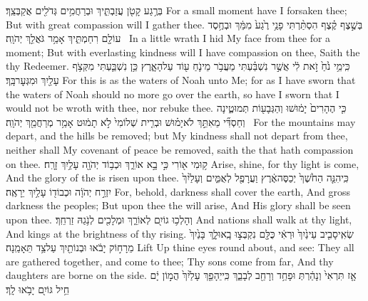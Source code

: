 {בְּרֶ֥גַע קָטֹ֖ן עֲזַבְתִּ֑יךְ וּבְרַחֲמִ֥ים גְּדֹלִ֖ים אֲקַבְּצֵֽךְ׃}
{For a small moment have I forsaken thee; But with great compassion will I gather thee.}
{בְּשֶׁ֣צֶף קֶ֗צֶף הִסְתַּ֨רְתִּי פָנַ֥י רֶ֙גַע֙ מִמֵּ֔ךְ וּבְחֶ֥סֶד עוֹלָ֖ם רִחַמְתִּ֑יךְ אָמַ֥ר גֹּאֲלֵ֖ךְ יְהֹוָֽה׃ \setuma }
{In a little wrath I hid My face from thee for a moment; But with everlasting kindness will I have compassion on thee, Saith the \lord\space thy Redeemer.}
{כִּֽי\maqqaf מֵ֥י נֹ֙חַ֙ זֹ֣את לִ֔י אֲשֶׁ֣ר נִשְׁבַּ֗עְתִּי מֵעֲבֹ֥ר מֵי\maqqaf נֹ֛חַ ע֖וֹד עַל\maqqaf הָאָ֑רֶץ כֵּ֥ן נִשְׁבַּ֛עְתִּי מִקְּצֹ֥ף עָלַ֖יִךְ וּמִגְּעׇר\maqqaf בָּֽךְ׃}
{For this is as the waters of Noah unto Me; for as I have sworn that the waters of Noah should no more go over the earth, so have I sworn that I would not be wroth with thee, nor rebuke thee.}
{כִּ֤י הֶהָרִים֙ יָמ֔וּשׁוּ וְהַגְּבָע֖וֹת תְּמוּטֶ֑ינָה וְחַסְדִּ֞י מֵאִתֵּ֣ךְ לֹא\maqqaf יָמ֗וּשׁ וּבְרִ֤ית שְׁלוֹמִי֙ לֹ֣א תָמ֔וּט אָמַ֥ר מְרַחֲמֵ֖ךְ יְהֹוָֽה׃ \setuma }
{For the mountains may depart, and the hills be removed; but My kindness shall not depart from thee, neither shall My covenant of peace be removed, saith the \lord\space that hath compassion on thee.}
\label{haft_50}
\setcounter{chap}{60}
\setcounter{verse}{1}
{ק֥וּמִי א֖וֹרִי כִּ֣י בָ֣א אוֹרֵ֑ךְ וּכְב֥וֹד יְהֹוָ֖ה עָלַ֥יִךְ זָרָֽח׃}
{Arise, shine, for thy light is come, And the glory of the \lord\space is risen upon thee.}
{כִּֽי\maqqaf הִנֵּ֤ה הַחֹ֙שֶׁךְ֙ יְכַסֶּה\maqqaf אֶ֔רֶץ וַעֲרָפֶ֖ל לְאֻמִּ֑ים וְעָלַ֙יִךְ֙ יִזְרַ֣ח יְהֹוָ֔ה וּכְבוֹד֖וֹ עָלַ֥יִךְ יֵרָאֶֽה׃}
{For, behold, darkness shall cover the earth, And gross darkness the peoples; But upon thee the \lord\space will arise, And His glory shall be seen upon thee.}
{וְהָלְכ֥וּ גוֹיִ֖ם לְאוֹרֵ֑ךְ וּמְלָכִ֖ים לְנֹ֥גַהּ זַרְחֵֽךְ׃}
{And nations shall walk at thy light, And kings at the brightness of thy rising.}
{שְׂאִֽי\maqqaf סָבִ֤יב עֵינַ֙יִךְ֙ וּרְאִ֔י כֻּלָּ֖ם נִקְבְּצ֣וּ בָֽאוּ\maqqaf לָ֑ךְ בָּנַ֙יִךְ֙ מֵרָח֣וֹק יָבֹ֔אוּ וּבְנוֹתַ֖יִךְ עַל\maqqaf צַ֥ד תֵּאָמַֽנָה׃}
{Lift Up thine eyes round about, and see: They all are gathered together, and come to thee; Thy sons come from far, And thy daughters are borne on the side.}
{אָ֤ז תִּרְאִי֙ וְנָהַ֔רְתְּ וּפָחַ֥ד וְרָחַ֖ב לְבָבֵ֑ךְ כִּֽי\maqqaf יֵהָפֵ֤ךְ עָלַ֙יִךְ֙ הֲמ֣וֹן יָ֔ם חֵ֥יל גּוֹיִ֖ם יָבֹ֥אוּ לָֽךְ׃}
